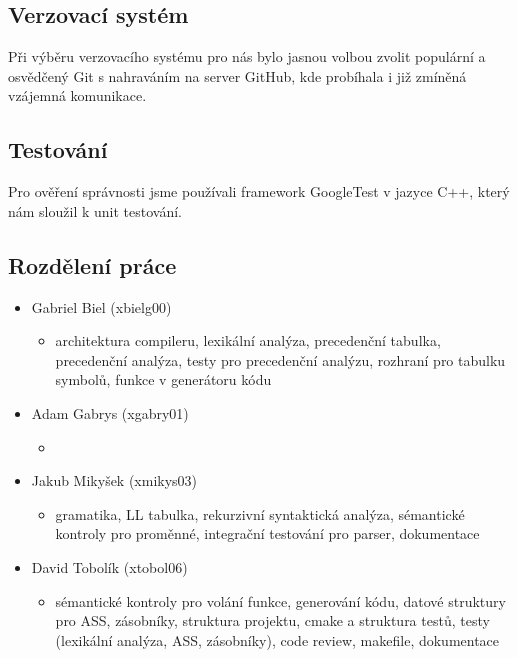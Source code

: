 \documentclass[a4paper, 12pt]{article}
\begin{document}
    \subsection{Verzovací systém}
        Při výběru verzovacího systému pro nás bylo jasnou volbou zvolit populární a osvědčený Git s nahraváním na server GitHub, kde probíhala i již zmíněná vzájemná komunikace.
    \subsection{Testování}
        Pro ověření správnosti jsme používali framework GoogleTest v jazyce C++, který nám sloužil k unit testování.
    \subsection{Rozdělení práce}
        \begin{itemize}
            \item Gabriel Biel (xbielg00)
                \begin{itemize}
                    \item architektura compileru, lexikální analýza, precedenční tabulka, precedenční analýza, testy pro precedenční analýzu, rozhraní pro tabulku symbolů, funkce v generátoru kódu
                \end{itemize}
            \item Adam Gabrys (xgabry01)
                \begin{itemize}
                    \item
                \end{itemize}
            \item Jakub Mikyšek (xmikys03)
                \begin{itemize}
                    \item gramatika, LL tabulka, rekurzivní syntaktická analýza, sémantické kontroly pro proměnné, integrační testování pro parser, dokumentace 
                \end{itemize}
            \item David Tobolík (xtobol06)
                \begin{itemize}
                    \item sémantické kontroly pro volání funkce, generování kódu, datové struktury pro ASS, zásobníky, struktura projektu, cmake a struktura testů, testy (lexikální analýza, ASS, zásobníky), code review, makefile, dokumentace
                \end{itemize}
        \end{itemize}
\end{document}
